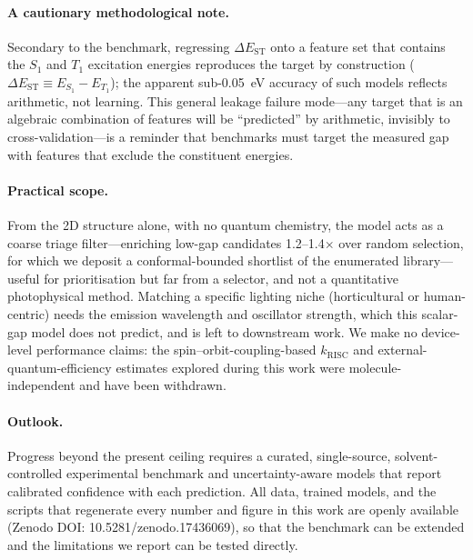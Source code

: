 \paragraph{A cautionary methodological note.}
Secondary to the benchmark, regressing $\Delta E_\text{ST}$ onto a feature set that
contains the $S_1$ and $T_1$ excitation energies reproduces the target by construction
($\Delta E_\text{ST}\equiv E_{S_1}-E_{T_1}$); the apparent sub-\num{0.05}~eV accuracy of
such models reflects arithmetic, not learning. This general leakage failure mode---any
target that is an algebraic combination of features will be ``predicted'' by
arithmetic, invisibly to cross-validation---is a reminder that benchmarks must target
the measured gap with features that exclude the constituent energies.

\paragraph{Practical scope.}
From the 2D structure alone, with no quantum chemistry, the model acts as a coarse
triage filter---enriching low-gap candidates \numrange{1.2}{1.4}$\times$ over random
selection, for which we deposit a conformal-bounded shortlist of the enumerated
library---useful for prioritisation but far from a selector, and not a quantitative
photophysical method. Matching a specific lighting niche (horticultural or
human-centric) needs the emission wavelength and oscillator strength, which this
scalar-gap model does not predict, and is left to downstream work.
We make no device-level performance claims: the spin--orbit-coupling-based
$k_\text{RISC}$ and external-quantum-efficiency estimates explored during this work
were molecule-independent and have been withdrawn.

\paragraph{Outlook.}
Progress beyond the present ceiling requires a curated, single-source,
solvent-controlled experimental benchmark and uncertainty-aware models that report
calibrated confidence with each prediction. All data, trained models, and the
scripts that regenerate every number and figure in this work are openly available
(Zenodo DOI: 10.5281/zenodo.17436069), so that the benchmark can be extended and
the limitations we report can be tested directly.

